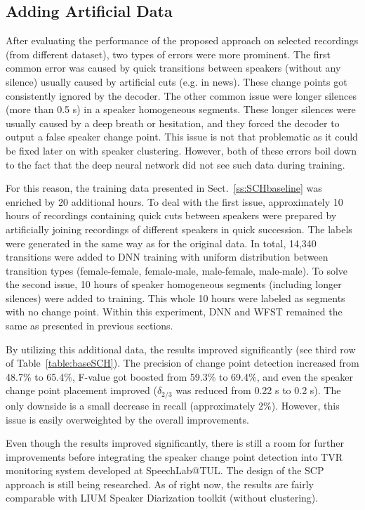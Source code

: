 \documentclass[FM,noheader,EN,bwtitles]{tulthesis}
\begin{document}
\subsection{Adding Artificial Data}
\label{ss:SCHartificial}
After evaluating the performance of the proposed approach on selected recordings (from different dataset), two types of errors were more prominent.
The first common error was caused by quick transitions between speakers (without any silence) usually caused by artificial cuts (e.g. in news).
These change points got consistently ignored by the decoder.
The other common issue were longer silences (more than 0.5 s) in a speaker homogeneous segments.
These longer silences were usually caused by a deep breath or hesitation, and they forced the decoder to output a false speaker change point.
This issue is not that problematic as it could be fixed later on with speaker clustering.
However, both of these errors boil down to the fact that the deep neural network did not see such data during training.

For this reason, the training data presented in Sect.~\ref{ss:SCHbaseline} was enriched by 20 additional hours.
To deal with the first issue, approximately 10 hours of recordings containing quick cuts between speakers were prepared by artificially joining recordings of different speakers in quick succession.
The labels were generated in the same way as for the original data.
In total, 14,340 transitions were added to DNN training with uniform distribution between transition types (female-female, female-male, male-female, male-male).
To solve the second issue, 10 hours of speaker homogeneous segments (including longer silences) were added to training. 
This whole 10 hours were labeled as segments with no change point.
Within this experiment, DNN and WFST remained the same as presented in previous sections.

By utilizing this additional data, the results improved significantly (see third row of Table~\ref{table:baseSCH}).
The precision of change point detection increased from 48.7\% to 65.4\%, \mbox{F-value} got boosted from 59.3\% to 69.4\%, and even the speaker change point placement improved ($\delta_{2/3}$ was reduced from 0.22 s to 0.2 s).
The only downside is a small decrease in recall (approximately 2\%).
However, this issue is easily overweighted by the overall improvements.

Even though the results improved significantly, there is still a room for further improvements before integrating the speaker change point detection into TVR monitoring system developed at SpeechLab@TUL.
The design of the SCP approach is still being researched.
As of right now, the results are fairly comparable with LIUM Speaker Diarization toolkit (without clustering).
\end{document}
